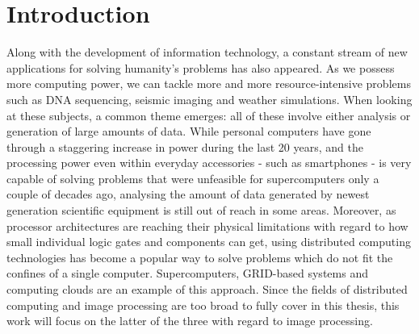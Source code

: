 \documentclass [12pt,a4paper]{report}
\begin{document}
\begin{tiitelleht}



\end{tiitelleht}


\tableofcontents

\chapter{Introduction}

Along with the development of information technology, a constant stream of new applications for solving humanity's problems has also appeared. As we possess more computing power, we can tackle more and more resource-intensive problems such as DNA sequencing, seismic imaging and weather simulations. When looking at these subjects, a common theme emerges: all of these involve either analysis or generation of large amounts of data. While personal computers have gone through a staggering increase in power during the last 20 years, and the processing power even within everyday accessories - such as smartphones - is very capable of solving problems that were unfeasible for supercomputers only a couple of decades ago, analysing the amount of data generated by newest generation scientific equipment is still out of reach in some areas. Moreover, as processor architectures are reaching their physical limitations with regard to how small individual logic gates and components can get, using distributed computing technologies has become a popular way to solve problems which do not fit the confines of a single computer. Supercomputers, GRID-based systems and computing clouds are an example of this approach. Since the fields of distributed computing and image processing are too broad to fully cover in this thesis, this work will focus on the latter of the three with regard to image processing.
\end{document}
